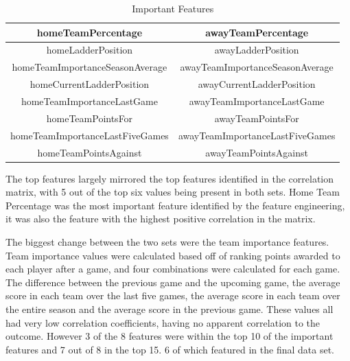 \documentclass{imc-inf}
\begin{document}
	\begin{table}[h!]
	\caption{Important Features}
	\centering	
	\begin{tabular}{| c | c |}
		\hline
		homeTeamPercentage & awayTeamPercentage\\
		\hline
		homeLadderPosition & awayLadderPosition\\
		\hline
		homeTeamImportanceSeasonAverage & awayTeamImportanceSeasonAverage \\
		\hline
		homeCurrentLadderPosition & awayCurrentLadderPosition \\
		\hline
		homeTeamImportanceLastGame & awayTeamImportanceLastGame \\
		\hline
		homeTeamPointsFor & awayTeamPointsFor \\
		\hline			
		homeTeamImportanceLastFiveGames & awayTeamImportanceLastFiveGames \\
		\hline
		homeTeamPointsAgainst & awayTeamPointsAgainst \\
		\hline		
	\end{tabular}	
	\end{table}

	The top features largely mirrored the top features identified in the correlation matrix, with 5 out of the top six values being present in both sets. Home Team Percentage was the most important feature identified by the feature engineering, it was also the feature with the highest positive correlation in the matrix. 
	
	The biggest change between the two sets were the team importance features. Team importance values were calculated based off of ranking points awarded to each player after a game, and four combinations were calculated for each game. The difference between the previous game and the upcoming game, the average score in each team over the last five games, the average score in each team over the entire season and the average score in the previous game. These values all had very low correlation coefficients, having no apparent correlation to the outcome. However 3 of the 8 features were within the top 10 of the important features and 7 out of 8 in the top 15. 6 of which featured in the final data set.
	
\end{document}
